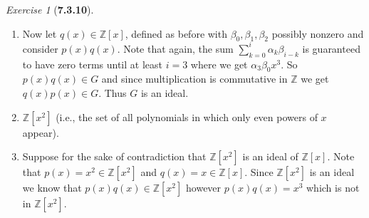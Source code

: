 \documentclass[12pt]{amsart}
\makeatletter
\theoremstyle{remark}
\newtheorem*{exercise}{Exercise}%
\def\ZZ{\ensuremath{\mathbb Z}}
\renewenvironment{proof}[1][\proofname]{\par\doublespacing
  \pushQED{\qed}%
  \normalfont \topsep6\p@\@plus6\p@\relax
  \list{}{%
    \settowidth{\leftmargin}{\itshape\proofname:\hskip\labelsep}%
    \setlength{\labelwidth}{0pt}%
    \setlength{\itemindent}{-\leftmargin}%
  }%
  \item[\hskip\labelsep\itshape#1\@addpunct{:}]\ignorespaces
}{%
  \popQED\endlist\@endpefalse
  \singlespacing
}
\theoremstyle{mycomment}
\makeatother
\begin{document}
\begin{exercise}[\textbf{7.3.10}]
\begin{enumerate}
\begin{proof}
      Now let $q(x) \in \ZZ[x]$, defined as before with $\beta_0, \beta_1, \beta_2$ possibly nonzero and consider $p(x)q(x)$. Note that again, the sum  $\sum_{k = 0}^i \alpha_k \beta_{i - k}$ 
      is guaranteed to have zero terms until at least $i = 3$ where we get $\alpha_3\beta_0 x^3$. So $p(x)q(x) \in G$ and since multiplication is commutative in $\ZZ$ we get $q(x)p(x) \in G$.
      Thus $G$ is an ideal. 
    \end{proof}
    \vspace{.15in}


    \item[d.] $\ZZ[x^2]$ (i.e., the set of all polynomials in which only even powers of $x$ appear). 
    \begin{proof} Suppose for the sake of contradiction that $\ZZ[x^2]$ is an ideal of $\ZZ[x]$. Note that 
      $p(x) = x^2 \in \ZZ[x^2]$ and $q(x) = x \in \ZZ[x]$. Since $\ZZ[x^2]$ is an ideal we know that $p(x)q(x) \in \ZZ[x^2]$
      however $p(x)q(x) = x^3$ which is not in $\ZZ[x^2]$. 
    \end{proof}
    \vspace{.15in}

  \end{enumerate} 
\end{exercise}
\vspace{.5in}
\end{document}
